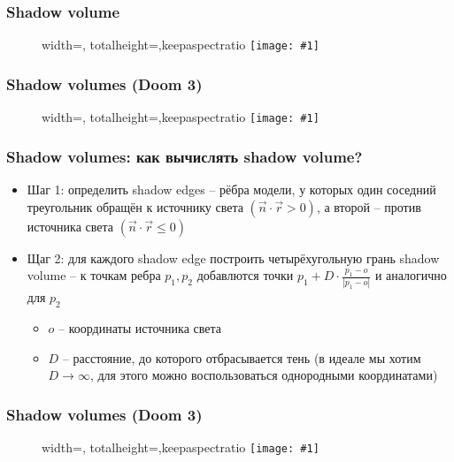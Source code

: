 \documentclass{beamer}
\newcommand{\slideimage}[1]{
  \begin{figure}
    \begin{adjustbox}{width=\textwidth, totalheight=\textheight-2\baselineskip-2\baselineskip,keepaspectratio}
      \texttt{[image: \#1]}
    \end{adjustbox}
  \end{figure}
}
\begin{document}
\begin{frame}[fragile]
\frametitle{Shadow volume}
\slideimage{shadow-volume3.png}
\end{frame}

\begin{frame}[fragile]
\frametitle{Shadow volumes (Doom 3)}
\slideimage{doom3-shadows.png}
\end{frame}

\begin{frame}[fragile]
\frametitle{Shadow volumes: как вычислять shadow volume?}
\begin{itemize}
\item Шаг 1: определить shadow edges -- рёбра модели, у которых один соседний треугольник обращён к источнику света \begin{math}\left(\vec n \cdot \vec r > 0\right)\end{math}, а второй -- против источника света \begin{math}\left(\vec n \cdot \vec r \leq 0\right)\end{math}
\pause
\item Щаг 2: для каждого shadow edge построить четырёхугольную грань shadow volume -- к точкам ребра \begin{math}p_1, p_2\end{math} добавлются точки \begin{math}p_1 + D \cdot \frac{p_1 - o}{|p_1 - o|}\end{math} и аналогично для \begin{math}p_2\end{math}
\begin{itemize}
\item \begin{math}o\end{math} -- координаты источника света
\item \begin{math}D\end{math} -- расстояние, до которого отбрасывается тень (в идеале мы хотим \begin{math}D\rightarrow\infty\end{math}, для этого можно воспользоваться однородными координатами)
\end{itemize}
\end{itemize}
\end{frame}

\begin{frame}[fragile]
\frametitle{Shadow volumes (Doom 3)}
\slideimage{shadow-edge.jpg}
\end{frame}
\end{document}
